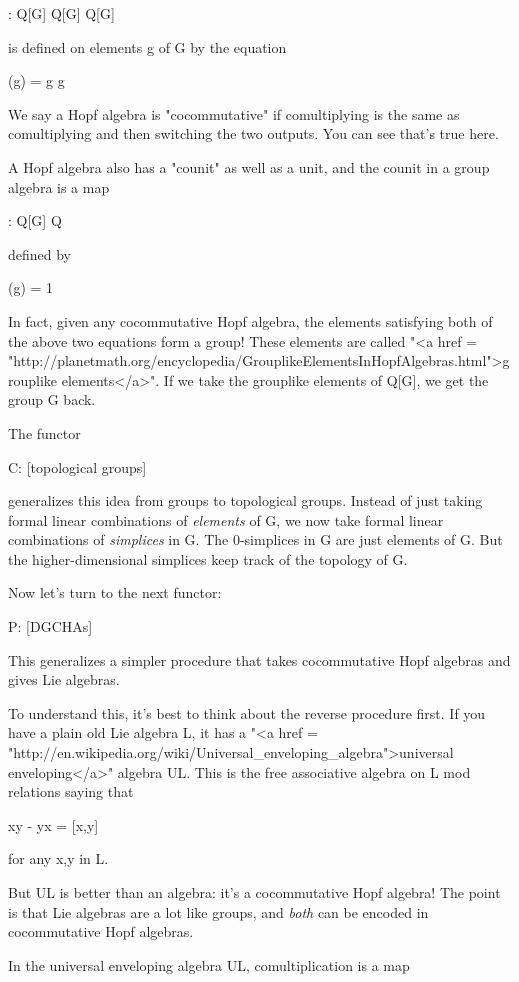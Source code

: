 \Delta : Q[G] \to  Q[G] \otimes  Q[G]

is defined on elements g of G by the equation

\Delta (g) = g \otimes  g

We say a Hopf algebra is "cocommutative" if comultiplying 
is the same as comultiplying and then switching the two outputs.
You can see that's true here.  

A Hopf algebra also has a "counit" as well as a unit, 
and the counit in a group algebra is a map

\epsilon  : Q[G] \to  Q 

defined by

\epsilon (g) = 1

In fact, given any cocommutative Hopf algebra, the elements satisfying
both of the above two equations form a group!  These elements are
called "<a href =
"http://planetmath.org/encyclopedia/GrouplikeElementsInHopfAlgebras.html">grouplike
elements</a>".  If we take the grouplike elements of Q[G], we get the
group G back.

The functor

C: [topological groups] \to  [DGCHAs]

generalizes this idea from groups to topological groups.  Instead of
just taking formal linear combinations of \emph{elements} of G, we
now take formal linear combinations of \emph{simplices} in G.  The
0-simplices in G are just elements of G.  But the higher-dimensional
simplices keep track of the topology of G.

Now let's turn to the next functor:

P: [DGCHAs] \to  [DGLAs]

This generalizes a simpler procedure that takes cocommutative Hopf
algebras and gives Lie algebras.

To understand this, it's best to think about the reverse procedure
first.  If you have a plain old Lie algebra L, it has a "<a href
=
"http://en.wikipedia.org/wiki/Universal_enveloping_algebra">universal
enveloping</a>" algebra UL.  This is the free associative algebra
on L mod relations saying that

xy - yx = [x,y]

for any x,y in L.

But UL is better than an algebra: it's a cocommutative Hopf algebra!
The point is that Lie algebras are a lot like groups, and \emph{both}
can be encoded in cocommutative Hopf algebras.  

In the universal enveloping algebra UL, comultiplication is a map

